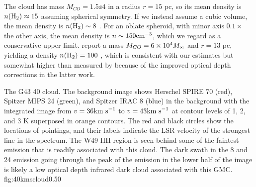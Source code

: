 %
%
% 
% 
% 
The cloud has mass $M_{CO} = 1.5\ee{4}$ \msun in a radius $r=15$ pc, so its
mean density is $n(\textrm{H}_{2}) \approx 15$ \percc assuming spherical symmetry.  If we
instead assume a cubic volume, the mean density is $n(\textrm{H}_{2})\sim8$ \percc.  For
an oblate spheroid, with minor axis $0.1\times$ the other axis, the mean
density is $n\sim150\textrm{cm}^{-3}$, which we regard as a conservative upper limit.
\citet{Simon2001} report a mass $M_{CO} = 6\times10^{4} M_{\odot}$ and $r=13$ pc,
yielding a density $n(\textrm{H}_{2})=100$ \percc, which is consistent with our estimates
but somewhat higher than measured by \citet{Roman-Duval2010a} because of the
improved optical depth corrections in the latter work.


{The G43 40 \kms cloud.  The background image shows Herschel SPIRE 70 \um (red),
Spitzer MIPS 24 \um (green), and Spitzer IRAC 8 \um (blue) in the background with
the \thirteenco integrated image from $v=36 \textrm{km~s}^{-1}$ to $v=43 \textrm{km~s}^{-1}$ at contour levels of
1, 2, and 3 K superposed in orange contours.  The red and black circles
show the locations of \formaldehyde pointings, and their labels indicate the LSR velocity
of the strongest line in the spectrum.  The W49 HII region is seen
behind some of the faintest \thirteenco emission that is readily associated
with this cloud.  The dark swath in the 8 and 24 \um emission going through the
peak of the \thirteenco emission in the lower half of the image is likely a low
optical depth infrared dark cloud associated with this GMC.}
{fig:40kmscloud}{0.5}{0}

